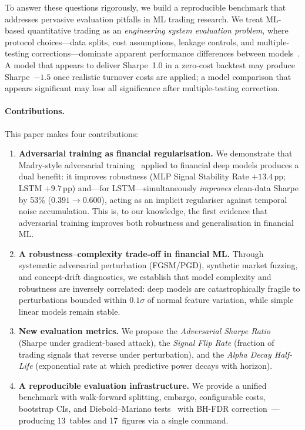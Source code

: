 \documentclass[preprint,review,12pt]{elsarticle}
\begin{document}
To answer these questions rigorously, we build a reproducible benchmark that addresses pervasive evaluation pitfalls in ML trading research.
We treat ML-based quantitative trading as an \emph{engineering system evaluation problem}, where protocol choices---data splits, cost assumptions, leakage controls, and multiple-testing corrections---dominate apparent performance differences between models~\citep{ref41,ref42,ref5}.
A model that appears to deliver Sharpe~1.0 in a zero-cost backtest may produce Sharpe~$-1.5$ once realistic turnover costs are applied; a model comparison that appears significant may lose all significance after multiple-testing correction.

\paragraph{Contributions.}
This paper makes four contributions:

\begin{enumerate}[leftmargin=1.6em]
  \item \textbf{Adversarial training as financial regularisation.} We demonstrate that Madry-style adversarial training~\citep{ref_madry_pgd} applied to financial deep models produces a dual benefit: it improves robustness (MLP Signal Stability Rate $+13.4$\,pp; LSTM $+9.7$\,pp) and---for LSTM---simultaneously \emph{improves} clean-data Sharpe by 53\% ($0.391 \to 0.600$), acting as an implicit regulariser against temporal noise accumulation. This is, to our knowledge, the first evidence that adversarial training improves both robustness and generalisation in financial ML.

  \item \textbf{A robustness--complexity trade-off in financial ML.} Through systematic adversarial perturbation (FGSM/PGD), synthetic market fuzzing, and concept-drift diagnostics, we establish that model complexity and robustness are inversely correlated: deep models are catastrophically fragile to perturbations bounded within $0.1\sigma$ of normal feature variation, while simple linear models remain stable.

  \item \textbf{New evaluation metrics.} We propose the \emph{Adversarial Sharpe Ratio} (Sharpe under gradient-based attack), the \emph{Signal Flip Rate} (fraction of trading signals that reverse under perturbation), and the \emph{Alpha Decay Half-Life} (exponential rate at which predictive power decays with horizon).

  \item \textbf{A reproducible evaluation infrastructure.} We provide a unified benchmark with walk-forward splitting, embargo, configurable costs, bootstrap CIs, and Diebold--Mariano tests~\citep{ref_dm} with BH-FDR correction~\citep{ref_bh}---producing 13~tables and 17~figures via a single command.
\end{enumerate}
\end{document}
